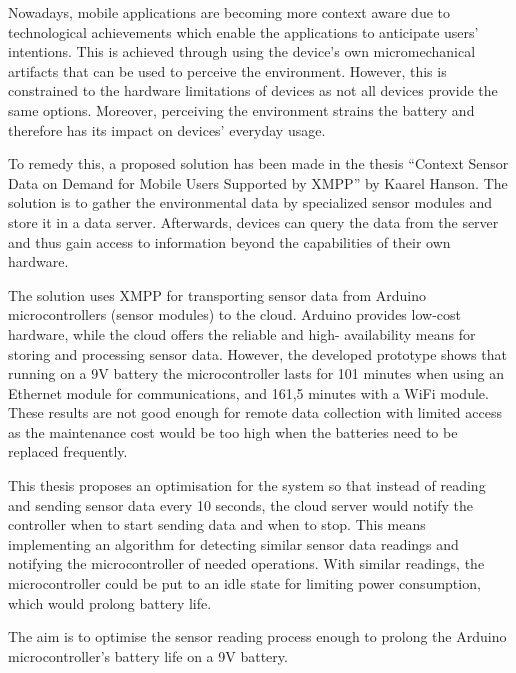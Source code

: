 


\begin{abstracts}        %

Nowadays, mobile applications are becoming more context aware due to technological
achievements which enable the applications to anticipate users’ intentions. This is
achieved through using the device’s own micromechanical artifacts that can be used to
perceive the environment. However, this is constrained to the hardware limitations of
devices as not all devices provide the same options. Moreover, perceiving the environment strains the battery and therefore has its impact on devices' everyday usage.

To remedy this, a proposed solution has been made in the thesis “Context Sensor Data on
Demand for Mobile Users Supported by XMPP” by Kaarel Hanson. The solution is to gather the environmental data by specialized sensor modules and store it in a data server. Afterwards, devices can query the data from the server and thus gain access to information beyond the capabilities of their own hardware.

The solution uses XMPP for transporting sensor data from Arduino microcontrollers (sensor modules) to the cloud. Arduino provides low-cost hardware, while the cloud offers the reliable and high-
availability means for storing and processing sensor data. However, the developed prototype shows that running on a 9V battery the microcontroller lasts for 101
minutes when using an Ethernet module for communications, and 161,5 minutes with a
WiFi module. These results are not good enough for remote data collection with limited access as the maintenance cost would be too high when the batteries need to be replaced frequently. 

This thesis proposes an optimisation for the system so that instead of reading and
sending sensor data every 10 seconds, the cloud server would notify the controller
when to start sending data and when to stop. This means implementing an algorithm
for detecting similar sensor data readings and notifying the microcontroller of needed
operations. With similar readings, the microcontroller could be put to an idle state for
limiting power consumption, which would prolong battery life.

The aim is to optimise the sensor reading process enough to prolong the Arduino
microcontroller’s battery life on a 9V battery.

\end{abstracts}


